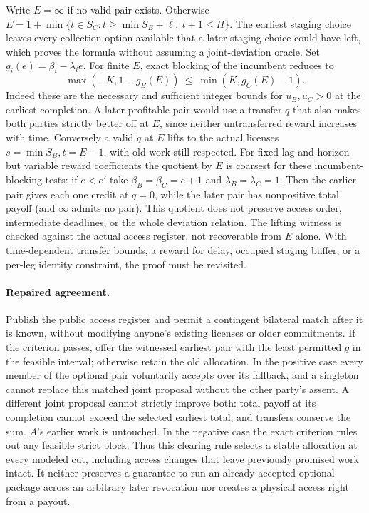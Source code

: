 \documentclass[11pt]{article}
\begin{document}
Write $E=\infty$ if no valid pair exists. Otherwise $E=1+\min\{t\in S_C:t\ge\min S_B+\ell,\ t+1\le H\}$. The earliest staging choice leaves every collection option available that a later staging choice could have left, which proves the formula without assuming a joint-deviation oracle. Set $g_i(e)=\beta_i-\lambda_i e$. For finite $E$, exact blocking of the incumbent reduces to
\[
  \max(-K,1-g_B(E))\ \le\ \min(K,g_C(E)-1).
\]
Indeed these are the necessary and sufficient integer bounds for $u_B,u_C>0$ at the earliest completion. A later profitable pair would use a transfer $q$ that also makes both parties strictly better off at $E$, since neither untransferred reward increases with time. Conversely a valid $q$ at $E$ lifts to the actual licenses $s=\min S_B,t=E-1$, with old work still respected. For fixed lag and horizon but variable reward coefficients the quotient by $E$ is coarsest for these incumbent-blocking tests: if $e<e'$ take $\beta_B=\beta_C=e+1$ and $\lambda_B=\lambda_C=1$. Then the earlier pair gives each one credit at $q=0$, while the later pair has nonpositive total payoff (and $\infty$ admits no pair). This quotient does not preserve access order, intermediate deadlines, or the whole deviation relation. The lifting witness is checked against the actual access register, not recoverable from $E$ alone. With time-dependent transfer bounds, a reward for delay, occupied staging buffer, or a per-leg identity constraint, the proof must be revisited.

\paragraph{Repaired agreement.}
Publish the public access register and permit a contingent bilateral match after it is known, without modifying anyone's existing licenses or older commitments. If the criterion passes, offer the witnessed earliest pair with the least permitted $q$ in the feasible interval; otherwise retain the old allocation. In the positive case every member of the optional pair voluntarily accepts over its fallback, and a singleton cannot replace this matched joint proposal without the other party's assent. A different joint proposal cannot strictly improve both: total payoff at its completion cannot exceed the selected earliest total, and transfers conserve the sum. $A$'s earlier work is untouched. In the negative case the exact criterion rules out any feasible strict block. Thus this clearing rule selects a stable allocation at every modeled cut, including access changes that leave previously promised work intact. It neither preserves a guarantee to run an already accepted optional package across an arbitrary later revocation nor creates a physical access right from a payout.
\end{document}
